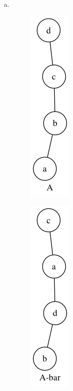 \begin{enumerate}[(a)]
	\item \ \\

        \begin{figure}[H]
        \centering
        \includegraphics[scale=0.5]{118/1.png}
        \end{figure}

        \begin{figure}[H]
        \centering
        \includegraphics[scale=0.5]{118/1i.png}
        \end{figure}


\end{enumerate}
